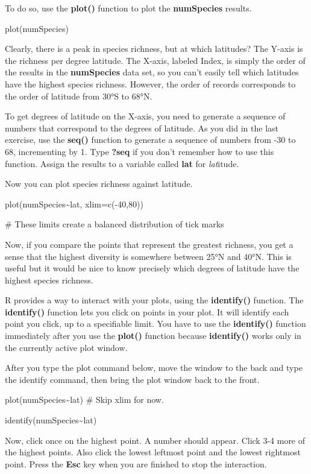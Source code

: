 To do so, use the \textbf{plot()} function to plot the
\textbf{numSpecies} results.

plot(numSpecies)

Clearly, there is a peak in species richness, but at which latitudes?
The Y-axis is the richness per degree latitude. The X-axis, labeled
Index, is simply the order of the results in the \textbf{numSpecies}
data set, so you can't easily tell which latitudes have the highest
species richness. However, the order of records corresponds to the order
of latitude from 30°S to 68°N.

To get degrees of latitude on the X-axis, you need to generate a
sequence of numbers that correspond to the degrees of latitude. As you
did in the last exercise, use the \textbf{seq()} function to generate a
sequence of numbers from -30 to 68, incrementing by 1. Type
\textbf{?seq} if you don't remember how to use this function. Assign the
results to a variable called \textbf{lat} for \emph{lat}itude.

Now you can plot species richness against latitude.

plot(numSpecies\textasciitilde{}lat, xlim=c(-40,80))

\# These limits create a balanced distribution of tick marks

Now, if you compare the points that represent the greatest richness, you
get a sense that the highest diversity is somewhere between 25°N and
40°N. This is useful but it would be nice to know precisely which
degrees of latitude have the highest species richness.

R provides a way to interact with your plots, using the
\textbf{identify()} function. The \textbf{identify()} function lets you
click on points in your plot. It will identify each point you click, up
to a specifiable limit. You have to use the \textbf{identify()} function
immediately after you use the \textbf{plot()} function because
\textbf{identify()} works only in the currently active plot window.

After you type the plot command below, move the window to the back and
type the identify command, then bring the plot window back to the front.

plot(numSpecies\textasciitilde{}lat) \# Skip xlim for now.

identify(numSpecies\textasciitilde{}lat)

Now, click once on the highest point. A number should appear. Click 3-4
more of the highest points. Also click the lowest leftmost point and the
lowest rightmost point. Press the \textbf{Esc} key when you are finished
to stop the interaction.

